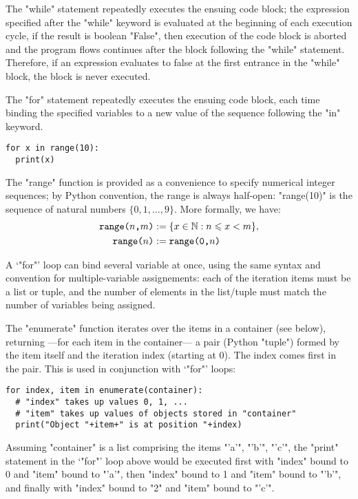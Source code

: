 {The "while" statement repeatedly executes the ensuing code block;
the expression specified after the "while" keyword is evaluated
at the beginning of each execution cycle, if the result is boolean
"False", then execution of the code block is aborted and the program
flows continues after the block following the "while" statement.
Therefore, if an expression evaluates to false at the first entrance
in the "while" block, the block is never executed.

The "for" statement repeatedly executes the ensuing code block,
each time binding the specified variables to a new value of the
sequence following the "in" keyword.
\begin{lstlisting}
for x in range(10):
  print(x)
\end{lstlisting}
The "range" function is provided as a convenience to specify
numerical integer sequences; by Python convention, the range is always
half-open: "range(10)" is the sequence of natural numbers $\{0,
1, \ldots, 9\}$.  More formally, we have:
\begin{align*}
  \text{\ttfamily range($n$,$m$)} &:= \{ x \in \mathbb{N} : n \leqslant x < m \},
  \\
  \text{\ttfamily range($n$)} &:= \text{\ttfamily range(0,$n$)}
\end{align*}

A `"for"' loop can bind several variable at once, using the same syntax
and convention for multiple-variable assignements: each of the
iteration items must be a list or tuple, and the number of elements in
the list/tuple must match the number of variables being assigned.

The "enumerate" function iterates over the items in a container (see
below), returning ---for each item in the container--- a pair (Python
"tuple") formed by the item itself and the iteration index (starting
at 0).  The index comes first in the pair.  This is used in
conjunction with `"for"' loops:
\begin{lstlisting}
for index, item in enumerate(container):
  # "index" takes up values 0, 1, ...
  # "item" takes up values of objects stored in "container"
  print("Object "+item+" is at position "+index)
\end{lstlisting}
Assuming "container" is a list comprising the items "'a'", "'b'",
"'c'", the "print" statement in the `"for"' loop above would be
executed first with "index" bound to 0 and "item" bound to "'a'", then
"index" bound to 1 and "item" bound to "'b'", and finally with "index"
bound to "2" and "item" bound to "'c'".



}
